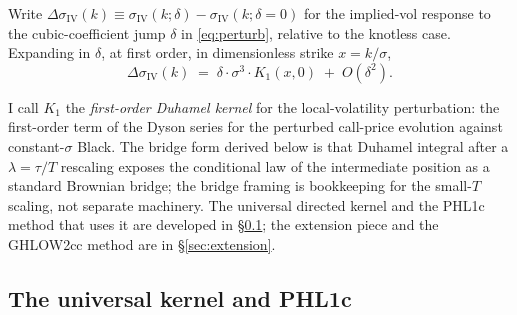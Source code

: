 \documentclass[11pt]{article}
\newcommand{\siv}{\sigma_{\mathrm{IV}}}
\begin{document}
Write $\Delta\siv(k) \equiv \siv(k;\delta) - \siv(k;\delta{=}0)$ for the
implied-vol response to the cubic-coefficient jump $\delta$ in
\eqref{eq:perturb}, relative to the knotless case. Expanding in
$\delta$, at first order, in dimensionless strike $x=k/\sigma$,
\begin{equation}
\Delta\siv(k) \;=\; \delta\cdot\sigma^{3}\cdot K_1(x,0)
\;+\;O(\delta^2).
\label{eq:expansion}
\end{equation}

I call $K_1$ the \emph{first-order Duhamel kernel} for the
local-volatility perturbation: the first-order term of the Dyson series
for the perturbed call-price evolution against constant-$\sigma$ Black.
The bridge form derived below is that Duhamel integral after a
$\lambda=\tau/T$ rescaling exposes the conditional law of the
intermediate position as a standard Brownian bridge; the bridge framing
is bookkeeping for the small-$T$ scaling, not separate machinery. The
universal directed kernel and the PHL1c method that uses it are
developed in \S\ref{sec:universal}; the extension piece and the
GHLOW2cc method are in \S\ref{sec:extension}.

\subsection{The universal kernel and PHL1c}\label{sec:universal}
\end{document}
